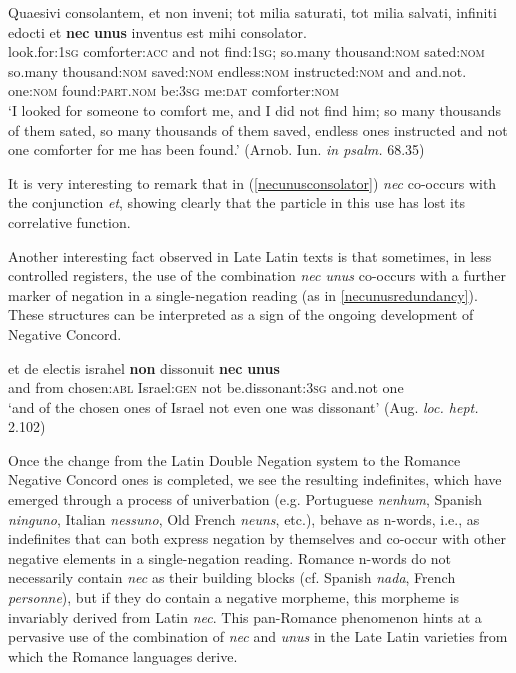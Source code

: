 \documentclass[output=paper,modfonts,nonflat,citecolor=brown,
showindex
]{langsci/langscibook}
\begin{document}
{\begin{exe}
\ex \label{necunusconsolator} \gll Quaesivi consolantem, et non inveni; tot milia saturati, tot milia salvati, infiniti edocti et {\textbf{nec}} {\textbf{unus}} inventus est mihi consolator.\\
look.for:{\textsc{1sg}} comforter:{\textsc{acc}} and not find:{\textsc{1sg}}; so.many thousand:{\textsc{nom}} sated:{\textsc{nom}} so.many thousand:{\textsc{nom}} saved:{\textsc{nom}} endless:{\textsc{nom}} instructed:{\textsc{nom}} and and.not. one:{\textsc{nom}} found:{\textsc{part.nom}} be:{\textsc{3sg}} me:{\textsc{dat}} comforter:{\textsc{nom}}\\  

`I looked for someone to comfort me, and I did not find him; so many thousands of them sated, so many thousands of them saved, endless ones instructed and not one comforter for me has been found.' (Arnob. Iun. {\emph{in psalm.}} 68.35)
\end{exe}}

\noindent It is very interesting to remark that in (\ref{necunusconsolator}) {\emph{nec}} co-occurs with the conjunction {\emph{et}}, showing clearly that the particle in this use has lost its correlative function.

Another interesting fact observed in Late Latin texts is that sometimes, in less controlled registers, the use of the combination {\emph{nec unus}} co-occurs with a further marker of negation in a single-negation reading (as in \ref{necunusredundancy}). These structures can be interpreted as a sign of the ongoing development of Negative Concord.

{\begin{exe}
\ex \label{necunusredundancy} \gll et de electis israhel {\textbf{non}} dissonuit {\textbf{nec}} {\textbf{unus}}\\
and from chosen:{\textsc{abl}} Israel:{\textsc{gen}} not be.dissonant:{\textsc{3sg}} and.not one\\ 

`and of the chosen ones of Israel not even one was dissonant' (Aug. {\emph{loc. hept.}} 2.102)
\end{exe}}

\noindent Once the change from the Latin Double Negation system to the Romance Negative Concord ones is completed, we see the resulting indefinites, which have emerged through a process of univerbation (e.g. Portuguese {\emph{nenhum}}, Spanish {\emph{ninguno}}, Italian {\emph{nessuno}}, Old French {\emph{neuns}}, etc.), behave as n-words, i.e., as indefinites that can both express negation by themselves and co-occur with other negative elements in a single-negation reading. Romance n-words do not necessarily contain {\emph{nec}} as their building blocks (cf. Spanish {\emph{nada}}, French {\emph{personne}}), but if they do contain a negative morpheme, this morpheme is invariably derived from Latin {\emph{nec}}. This pan-Romance phenomenon hints at a pervasive use of the combination of {\emph{nec}} and {\emph{unus}} in the Late Latin varieties from which the Romance languages derive.
\end{document}

